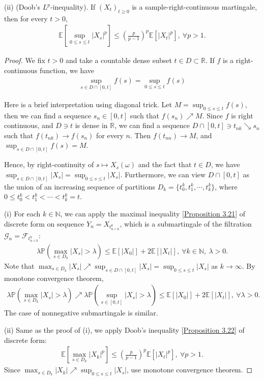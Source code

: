 \documentclass{article}
\numberwithin{equation}{section}
\newcommand{\E}{\mathbb{E}}
\renewcommand{\P}{\mathbb{P}}
\theoremstyle{plain}
\theoremstyle{definition}
\begin{document}
(ii) (Doob's $L^p$-inequality). If $(X_t)_{t\geq 0}$ is a sample-right-continuous martingale, then for every $t>0$,
\begin{align*}
	\E\left[\sup_{0\leq s\leq t}\vert X_s\vert^p\right]\leq\left(\frac{p}{p-1}\right)^p\E\left[\vert X_t\vert^p\right],\ \forall p>1.
\end{align*}
\begin{proof}
We fix $t>0$ and take a countable dense subset $t\in D\subset\mathbb{R}$. If $f$ is a right-continuous function, we have 
\begin{align*}
	\sup_{s\in D\cap[0,t]} f(s) =\sup_{0\leq s\leq t}f(s)
\end{align*}

Here is a brief interpretation using diagonal trick. Let $M=\sup_{0\leq s\leq t}f(s)$, then we can find a sequence $s_n\in[0,t]$ such that $f(s_n)\nearrow M$. Since $f$ is right continuous, and $D\ni t$ is dense in $\mathbb{R}$, we can find a sequence $D\cap[0,t]\ni t_{nk}\searrow s_n$ such that $f(t_{nk})\to f(s_n)$ for every $n$. Then $f(t_{nn})\to M$, and $\sup_{s\in D\cap[0,t]}f(s)=M$.

Hence, by right-continuity of $s\mapsto X_s(\omega)$ and the fact that $t\in D$, we have $\sup_{s\in D\cap[0,t]}\vert X_s\vert=\sup_{0\leq s\leq t}\vert X_s\vert$. Furthermore, we can view $D\cap[0,t]$ as the union of an increasing sequence of partitions $D_k=\{t_0^k,t_1^k,\cdots,t_k^k\}$, where $0\leq t_0^k<t_1^k<\cdots<t_k^k=t$. \vspace{0.1cm}

(i) For each $k\in\mathbb{N}$, we can apply the maximal inequality [\hyperref[prop:3.21]{Proposition 3.21}] of discrete form on sequence $Y_n=X_{t_{n\wedge k}^k}$, which is a submartingale of the filtration $\mathscr{G}_n=\mathscr{F}_{t_{n\wedge k}^k}$:
\begin{align*}
	\lambda\P\left(\max_{s\in D_k}\vert X_s\vert>\lambda\right)\leq \E[\vert X_0\vert]+2\E[\vert X_t\vert],\ \forall k\in\mathbb{N},\ \lambda>0.
\end{align*}
Note that $\max_{s\in D_k}\vert X_s\vert\nearrow\sup_{s\in D\cap[0,t]}\vert X_s\vert=\sup_{0\leq s\leq t}\vert X_s\vert$ as $k\to\infty$. By monotone convergence theorem, 
\begin{align*}
	\lambda\P\left(\max_{s\in D_k}\vert X_s\vert>\lambda\right)\nearrow\lambda\P\left(\sup_{s\in[0,t]}\vert X_s\vert>\lambda\right)\leq \E[\vert X_0\vert]+2\E[\vert X_t\vert],\ \forall\lambda>0.
\end{align*}
The case of nonnegative submartingale is similar. \vspace{0.1cm}

(ii) Same as the proof of (i), we apply Doob's inequality [\hyperref[prop:3.22]{Proposition 3.22}] of discrete form:
\begin{align*}
	\E\left[\max_{s\in D_k}\vert X_k\vert^p\right]\leq\left(\frac{p}{p-1}\right)^p\E\left[\vert X_t\vert^p\right],\ \forall p >1.
\end{align*}
Since $\max_{s\in D_k}\vert X_k\vert\nearrow\sup_{0\leq s\leq t}\vert X_s\vert$, use monotone convergence theorem.
\end{proof}
\end{document}

